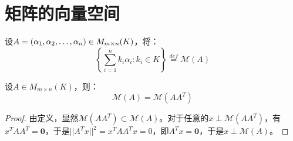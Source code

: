 \section{矩阵的向量空间}

\begin{definition}
	设$A=(\alpha_1, \alpha_2, \dots, \alpha_{n})\in M_{m\times n}(K)$，将：
	\begin{equation*}
		\left\{\sum_{i=1}^{n}k_i\alpha_i:k_i\in K\right\}\overset{def}{=}\mathcal{M}(A)
	\end{equation*}
\end{definition}

\begin{theorem}\label{theo:VectorSpaceAAAT}
	设$A\in M_{m\times n}(K)$，则：
	\begin{equation*}
		\mathcal{M}(A)=\mathcal{M}(AA^T)
	\end{equation*}
\end{theorem}
\begin{proof}
	由定义，显然$\mathcal{M}(AA^T)\subset\mathcal{M}(A)$。对于任意的$x\perp\mathcal{M}(AA^T)$，有$x^TAA^T=\mathbf{0}$，于是$||A^Tx||^2=x^TAA^Tx=0$，即$A^Tx=\mathbf{0}$，于是$x\perp\mathcal{M}(A)$。
\end{proof}